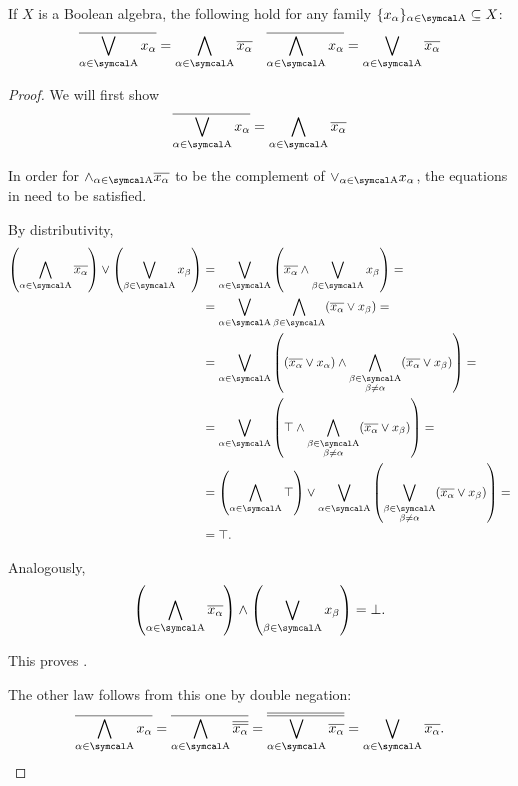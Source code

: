 \begin{theorem}\label{thm:de_morgans_laws}
  If \( X \) is a Boolean algebra, the following hold for any family \( \{ x_\al \}_{\al \in \CA} \subseteq X \):
  \begin{align*}
    \Ol{\bigvee_{\al \in \CA} x_\al} = \bigwedge_{\al \in \CA} \Ol{x_\al}
    &&
    \Ol{\bigwedge_{\al \in \CA} x_\al} = \bigvee_{\al \in \CA} \Ol{x_\al}
  \end{align*}
\end{theorem}
\begin{proof}
  We will first show
  \begin{equation}\label{thm:de_morgans_laws/equation}
    \Ol{\bigvee_{\al \in \CA} x_\al} = \bigwedge_{\al \in \CA} \Ol{x_\al}
  \end{equation}

  In order for \( \wedge_{\al \in \CA} \Ol{x_\al} \) to be the complement of \( \vee_{\al \in \CA} x_\al \), the equations in  need to be satisfied.

  By distributivity,
  \begin{align*}
    \left( \bigwedge_{\al \in \CA} \Ol{x_\al} \right) \vee \left( \bigvee_{\beta \in \CA} x_\beta \right)
    &=
    \bigvee_{\al \in \CA} \left( \Ol{x_\al} \wedge \bigvee_{\beta \in \CA} x_\beta \right)
    = \\ &=
    \bigvee_{\al \in \CA} \bigwedge_{\beta \in \CA} (\Ol{x_\al} \vee x_\beta)
    = \\ &=
    \bigvee_{\al \in \CA} \left( (\Ol{x_\al} \vee x_\al) \wedge \bigwedge_{\substack{\beta \in \CA \\ \beta \neq \al}} (\Ol{x_\al} \vee x_\beta) \right)
    = \\ &=
    \bigvee_{\al \in \CA} \left( \top \wedge \bigwedge_{\substack{\beta \in \CA \\ \beta \neq \al}} (\Ol{x_\al} \vee x_\beta) \right)
    = \\ &=
    \left( \bigwedge_{\al \in \CA} \top \right) \vee \bigvee_{\al \in \CA} \left( \bigvee_{\substack{\beta \in \CA \\ \beta \neq \al}} (\Ol{x_\al} \vee x_\beta) \right)
    = \\ &=
    \top.
  \end{align*}

  Analogously,
  \begin{equation*}
    \left( \bigwedge_{\al \in \CA} \Ol{x_\al} \right) \wedge \left( \bigvee_{\beta \in \CA} x_\beta \right) = \bot.
  \end{equation*}

  This proves .

  The other law follows from this one by double negation:
  \begin{equation*}
    \Ol{\bigwedge_{\al \in \CA} x_\al}
    =
    \Ol{\bigwedge_{\al \in \CA} \Ol{\Ol{x_\al}}}
    =
    \Ol{\Ol{\bigvee_{\al \in \CA} \Ol{x_\al}}}
    =
    \bigvee_{\al \in \CA} \Ol{x_\al}.
  \end{equation*}
\end{proof}

